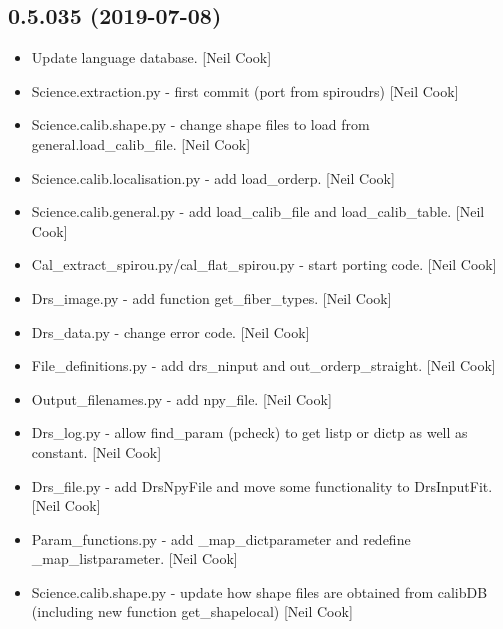 \documentclass[a4paper,10pt,english]{report}
\begin{document}
\subsection{0.5.035 (2019-07-08)}
\label{\detokenize{misc/changelog:id103}}\begin{itemize}
\item {} 
Update language database. {[}Neil Cook{]}

\item {} 
Science.extraction.py - first commit (port from spiroudrs) {[}Neil Cook{]}

\item {} 
Science.calib.shape.py - change shape files to load from
general.load\_calib\_file. {[}Neil Cook{]}

\item {} 
Science.calib.localisation.py - add load\_orderp. {[}Neil Cook{]}

\item {} 
Science.calib.general.py - add load\_calib\_file and load\_calib\_table.
{[}Neil Cook{]}

\item {} 
Cal\_extract\_spirou.py/cal\_flat\_spirou.py - start porting code. {[}Neil
Cook{]}

\item {} 
Drs\_image.py - add function get\_fiber\_types. {[}Neil Cook{]}

\item {} 
Drs\_data.py - change error code. {[}Neil Cook{]}

\item {} 
File\_definitions.py - add drs\_ninput and out\_orderp\_straight. {[}Neil
Cook{]}

\item {} 
Output\_filenames.py - add npy\_file. {[}Neil Cook{]}

\item {} 
Drs\_log.py - allow find\_param (pcheck) to get listp or dictp as well
as constant. {[}Neil Cook{]}

\item {} 
Drs\_file.py - add DrsNpyFile and move some functionality to
DrsInputFit. {[}Neil Cook{]}

\item {} 
Param\_functions.py - add \_map\_dictparameter and redefine
\_map\_listparameter. {[}Neil Cook{]}

\item {} 
Science.calib.shape.py - update how shape files are obtained from
calibDB (including new function get\_shapelocal) {[}Neil Cook{]}


\end{itemize}
\end{document}

